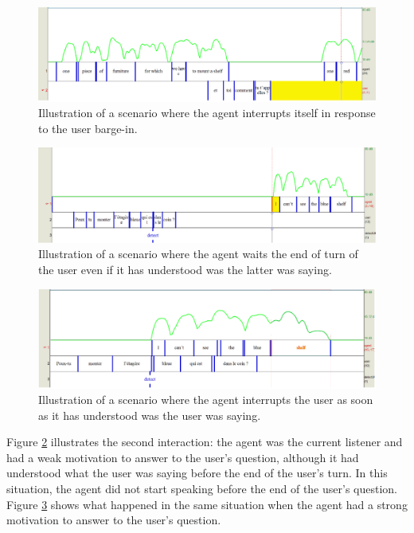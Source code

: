 \begin{figure}
\centering
\includegraphics[width=\linewidth]{figure/volume_transcript_1_2.png}
\caption{Illustration of a scenario where the agent interrupts itself in response to the user barge-in.}
\label{sc_2}
\end{figure}

\begin{figure}
\centering
\includegraphics[width=\linewidth]{figure/volume_transcript_2_2.png}
\caption{Illustration of a scenario where the agent waits the end of turn of the user even if it has understood was the latter was saying.}
\label{sc_3}
\end{figure}

\begin{figure}
\centering
\includegraphics[width=\linewidth]{figure/volume_transcript_2_1.png}
\caption{Illustration of a scenario where the agent interrupts the user as soon as it has understood was the user was saying.}
\label{sc_4}
\end{figure}

Figure \ref{sc_3} illustrates the second interaction: the agent was the current listener and had a weak motivation to answer to the user's question, although it had understood what the user was saying before the end of the user's turn. In this situation, the agent did not start speaking before the end of the user's question. Figure \ref{sc_4} shows what happened in the same situation when the agent had a strong motivation to answer to the user's question. 

